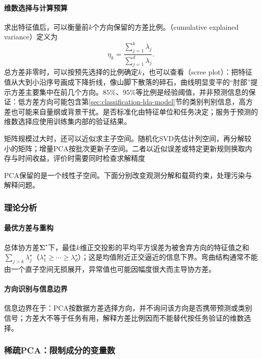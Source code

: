 \paragraph{维数选择与计算预算}

求出特征值后，可以衡量前$k$个方向保留的方差比例。（cumulative explained variance）定义为
\begin{equation}
  \eta_k=\frac{\sum_{j=1}^{k}\lambda_j}
                    {\sum_{j=1}^{d}\lambda_j}.
  \label{eq:dim-explained-variance}
\end{equation}
总方差非零时，可以按预先选择的比例确定$k$，也可以查看（scree plot）：把特征值从大到小沿序号画成下降折线，像山脚下散落的碎石，曲线明显变平的“肘部”提示方差主要集中在前几个方向。$85\%$、$95\%$等比例是经验阈值，并非预测信息的保证：低方差方向可能包含第\ref{sec:classification-lda-model}节的类别判别信息，高方差也可能来自量纲或背景干扰。是否标准化由特征单位和任务决定；服务于预测的维数选择应使用训练集内部的验证结果。

矩阵规模过大时，还可以近似求主子空间。随机化SVD先估计列空间，再分解较小的矩阵；增量PCA按批次更新子空间。二者以近似误差或特定更新规则换取内存与时间收益，评价时需要同时检查求解精度

PCA保留的是一个线性子空间。下面分别改变观测分解和载荷约束，处理污染与解释问题。

\subsubsection{理论分析}

\paragraph{最优方差与重构}

总体协方差$\bm\Sigma^\star$下，最佳$k$维正交投影的平均平方误差为被舍弃方向的特征值之和$\sum_{j>k}\lambda_j^\star$（$\lambda_1^\star\geq\cdots\geq\lambda_d^\star$）；这是均值附近正交逼近的信息下界。弯曲结构通常不能由一个直子空间无损展开，异常值也可能因幅度很大而主导协方差。

\paragraph{方向识别与信息边界}

信息边界在于：PCA按数据方差选择方向，并不询问该方向是否携带预测或类别信号；方差大不等于任务有用，解释方差比例因而不能替代按任务验证的维数选择。

\subsubsection{稀疏PCA：限制成分的变量数}

